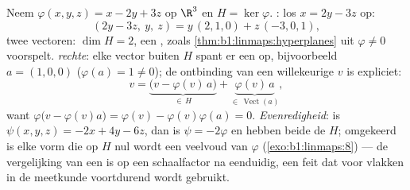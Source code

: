\begin{example}
\label{ex:b1:linmaps:hyperplanerun}
Neem $\varphi(x, y, z) = x - 2y + 3z$ op $\R^3$ en $H =
\ker\varphi$. \emph{}: los $x = 2y - 3z$ op:
\[
(2y - 3z,\ y,\ z) = y\,(2, 1, 0) + z\,(-3, 0, 1),
\]
twee  vectoren: $\dim H = 2$, een , zoals
\cref{thm:b1:linmaps:hyperplanes} uit $\varphi \neq 0$
voorspelt. \emph{ rechte}: elke vector buiten $H$
spant er een op, bijvoorbeeld $a = (1, 0, 0)$ ($\varphi(a) = 1
\neq 0$); de ontbinding van een willekeurige $v$ is expliciet:
\[
v = \underbrace{\bigl(v - \varphi(v)\,a\bigr)}_{\in\,H}
+ \underbrace{\varphi(v)\,a}_{\in\,\operatorname{Vect}(a)},
\]
want $\varphi\bigl(v - \varphi(v)a\bigr) = \varphi(v) -
\varphi(v)\varphi(a) = 0$. \emph{Evenredigheid}: is $\psi(x,y,z) =
-2x + 4y - 6z$, dan is $\psi = -2\varphi$ en hebben beide de 
$H$; omgekeerd is elke vorm die op $H$ nul wordt een veelvoud van
$\varphi$ (\cref{exo:b1:linmaps:8}) --- de vergelijking van een
 is op een schaalfactor na eenduidig, een feit dat voor
vlakken in de meetkunde voortdurend wordt gebruikt.
\end{example}

